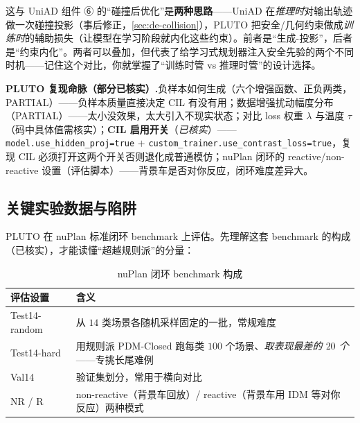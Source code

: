 \begin{insight}
这与 UniAD 组件 ⑥ 的“碰撞后优化”是\textbf{两种思路}——UniAD 在\emph{推理时}对输出轨迹做一次碰撞投影（事后修正，\cref{sec:de-collision}），PLUTO 把安全/几何约束做成\emph{训练时}的辅助损失（让模型在学习阶段就内化这些约束）。前者是“生成-投影”，后者是“约束内化”。两者可以叠加，但代表了给学习式规划器注入安全先验的两个不同时机——记住这个对比，你就掌握了“训练时管 vs 推理时管”的设计选择。
\end{insight}

\begin{note}
\textbf{PLUTO 复现命脉（部分已核实）.}\;负样本如何生成（六个增强函数、正负两类，PARTIAL）——负样本质量直接决定 CIL 有没有用；数据增强扰动幅度分布（PARTIAL）——太小没效果，太大引入不现实状态；对比 loss 权重 $\lambda$ 与温度 $\tau$（码中具体值需核实）；\textbf{CIL 启用开关}（\emph{已核实}）——\texttt{model.\allowbreak use\_hidden\_proj=true} $+$ \texttt{custom\_trainer.\allowbreak use\_contrast\_loss=true}，复现 CIL 必须打开这两个开关否则退化成普通模仿；nuPlan 闭环的 reactive/non-reactive 设置（评估脚本）——背景车是否对你反应，闭环难度差异大。
\end{note}

\subsection{关键实验数据与陷阱}
\label{sec:de-pluto-exp}

PLUTO 在 nuPlan 标准闭环 benchmark 上评估。先理解这套 benchmark 的构成（已核实），才能读懂“超越规则派”的分量：

\begin{table}[H]\centering\small
\caption{nuPlan 闭环 benchmark 构成}
\label{tab:de-nuplan-bench}
\begin{tabular}{p{} p{}}
\toprule
评估设置 & 含义 \\
\midrule
Test14-random & 从 $14$ 类场景各随机采样固定的一批，常规难度 \\
Test14-hard & 用规则派 PDM-Closed 跑每类 $100$ 个场景、\emph{取表现最差的 $20$ 个}——专挑长尾难例 \\
Val14 & 验证集划分，常用于横向对比 \\
NR / R & non-reactive（背景车回放）/ reactive（背景车用 IDM 等对你反应）两种模式 \\
\bottomrule
\end{tabular}
\end{table}

